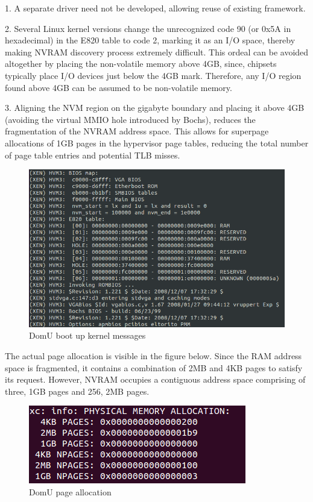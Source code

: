 1. A separate driver need not be developed, allowing reuse of existing framework.

2. Several Linux kernel versions change the unrecognized code 90 (or 0x5A in hexadecimal) in the E820 table to code 2, marking it as an I/O space, thereby making NVRAM discovery process extremely difficult. This ordeal can be avoided altogether by placing the non-volatile memory above 4GB, since, chipsets typically place I/O devices just below the 4GB mark. Therefore, any I/O region found above 4GB can be assumed to be non-volatile memory.

3. Aligning the NVM region on the gigabyte boundary and placing it above 4GB (avoiding the virtual MMIO hole introduced by Bochs), reduces the fragmentation of the NVRAM address space. This allows for superpage allocations of 1GB pages in the hypervisor page tables, reducing the total number of page table entries and potential TLB misses. 

\begin{figure}[H]
\centering
\includegraphics[scale=0.8]{figures/domu_boot1.png}
\caption{DomU boot up kernel messages}
\label{fig:bochs}
\end{figure}

The actual page allocation is visible in the figure below. Since the RAM address space is fragmented, it contains a combination of 2MB and 4KB pages to satisfy its request. However, NVRAM occupies a contiguous address space comprising of three, 1GB pages and 256, 2MB pages. 


\begin{figure}[H]
\centering
\includegraphics{figures/page_allocation_domu.png}
\caption{DomU page allocation}
\label{fig:page_alloc}
\end{figure}


